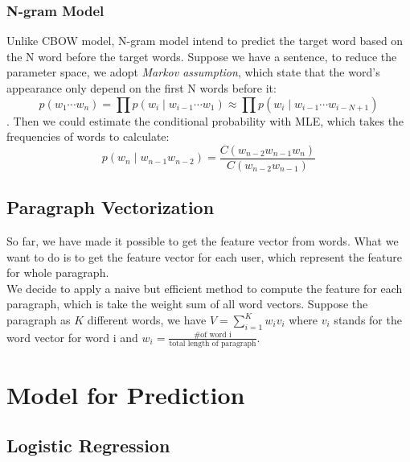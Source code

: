 \documentclass{article}
\begin{document}
\subsubsection{N-gram Model}
Unlike CBOW model, N-gram model intend to predict the target word based on the N word before the target words. Suppose we have a sentence, to reduce the parameter space, we adopt \emph{Markov assumption}, which state that the word's appearance only depend on the first N words before it: $$p\left(w_{1} \cdots w_{n}\right)=\prod p\left(w_{i} \mid w_{i-1} \cdots w_{1}\right) \approx \prod p\left(w_{i} \mid w_{i-1} \cdots w_{i-N+1}\right)$$. Then we could estimate the conditional probability with MLE, which takes the frequencies of words to calculate:$$p\left(w_{n} \mid w_{n-1} w_{n-2}\right)=\frac{C\left(w_{n-2} w_{n-1} w_{n}\right)}{C\left(w_{n-2} w_{n-1}\right)}$$

\subsection{Paragraph Vectorization}
So far, we have made it possible to get the feature vector from words. What we want to do is to get the feature vector for each user, which represent the feature for whole paragraph.\\
We decide to apply a naive but efficient method to compute the feature for each paragraph, which is take the weight sum of all word vectors. Suppose the paragraph as $K$ different words, we have $V = \sum_{i=1}^{K}w_iv_i$ where $v_i$ stands for the word vector for word i and $w_i = \frac{\text{\# of word i}}{\text{total length of paragraph}}$.

\section{Model for Prediction}
\subsection{Logistic Regression}

\end{document}
